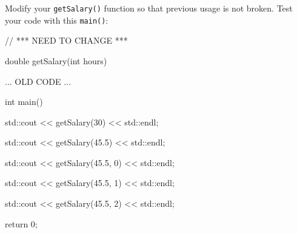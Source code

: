 Modify your \texttt{getSalary()} function so that previous usage is not broken. Test your code with this \texttt{main()}:



\begin{consolethree}[escapeinside=||]

// *** NEED TO CHANGE ***

double getSalary(int hours)

{

    ... OLD CODE ...

}



int main()

{

    std::cout << getSalary(30) << std::endl;

    std::cout << getSalary(45.5) << std::endl;

    std::cout << getSalary(45.5, 0) << std::endl;

    std::cout << getSalary(45.5, 1) << std::endl;

    std::cout << getSalary(45.5, 2) << std::endl;

    return 0;

}

\end{consolethree}

